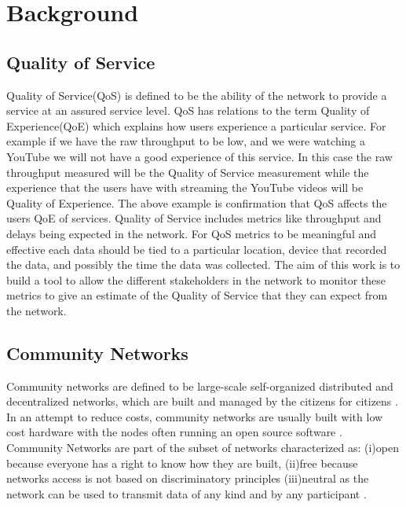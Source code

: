 \section{Background}\label{sec:background}
\subsection{Quality of Service}\label{subsec:quality-of-services}
Quality of Service(QoS) is defined to be the ability of the network to provide a service at an assured service level\cite{soldani_book}.
QoS has relations to the term Quality of Experience(QoE) which explains how users experience a particular service\cite{6462223}.
For example if we have the raw throughput to be low, and we were watching a YouTube we will not have a good experience of this service.
In this case the raw throughput measured will be the Quality of Service measurement while the experience that the users have with streaming the YouTube videos will be Quality of Experience.
The above example is confirmation that QoS affects the users QoE of services.
Quality of Service includes metrics like throughput and delays being expected in the network.
For QoS metrics to be meaningful and effective each data should be tied to a particular location, device that recorded the data, and possibly the time the data was collected.
The aim of this work is to build a tool to allow the different stakeholders in the network to monitor these metrics to give an estimate of the Quality of Service that they can expect from the network.

\subsection{Community Networks}\label{subsec:community-networks}
Community networks are defined to be large-scale self-organized distributed and decentralized networks, which are built and managed by the citizens for citizens \cite{Braem:2013:CRC:2500098.2500108}.
In an attempt to reduce costs, community networks are usually built with low cost hardware with the nodes often running an open source software \cite{Braem:2013:CRC:2500098.2500108}.
Community Networks are part of the subset of networks characterized as:
(i)open because everyone has a right to know how they are built,
(ii)free because networks access is not based on discriminatory principles
(iii)neutral as the network can be used to transmit data of any kind and by any participant \cite{Braem:2015:AEQ:2830629.2830639}.

